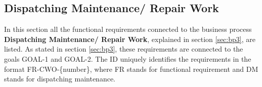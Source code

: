\begin{center}
\begin{longtable}{|c|p{4cm}|p{4cm}|c|c|}
\end{longtable}
\end{center}

\subsection{Dispatching Maintenance/ Repair Work}
\label{sub:dispatching_maintenance}	
In this section all the functional requirements connected to the business process \textbf{Dispatching Maintenance/ Repair Work}, explained in section \ref{sec:bp3}, are listed. As stated in section \ref{sec:bp3}, these requirements are connected to the goals GOAL-1 and GOAL-2. The ID uniquely identifies the requirements in the format FR-CWO-\{number\}, where  FR stands for functional requirement and DM stands for dispatching maintenance. 


